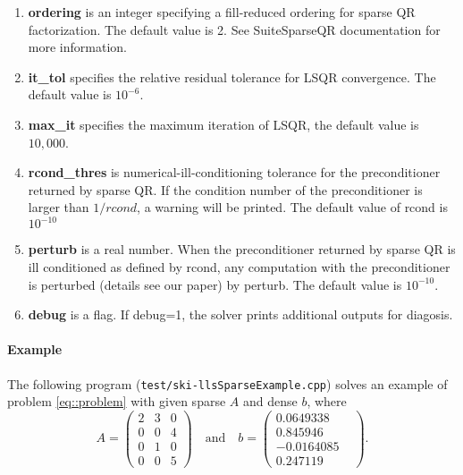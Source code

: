 \documentclass[english,11pt]{article}
\begin{document}
\begin{itemize}
\begin{enumerate}
			\item {\bf ordering} is an integer specifying a fill-reduced ordering for sparse QR factorization. The default value is 2. See SuiteSparseQR documentation for more information. 

			\item {\bf it_tol} specifies the relative residual tolerance for LSQR convergence. The default value is $10^{-6}$.
			

			\item {\bf max_it} specifies the maximum iteration of LSQR, the default value is $10,000$. 

			\item {\bf rcond_{thres}} is numerical-ill-conditioning tolerance for the preconditioner returned by sparse QR. If the condition number of the preconditioner is larger than $1/rcond$, a warning will be printed. The default value of rcond is $10^{-10}$

			\item {\bf perturb} is a real number. When the preconditioner returned by sparse QR is ill conditioned as defined by rcond, any computation with the preconditioner is perturbed (details see our paper) by perturb. The default value is $10^{-10}$. 

			\item {\bf debug} is a flag. If debug=1, the solver prints additional outputs for diagosis. 
		\end{enumerate}
		

	\end{itemize}

\paragraph{Example}

The following program ({\tt test/ski-llsSparseExample.cpp}) solves an example of problem \eqref{eq::problem} with given sparse $A$ and dense $b$, where 
\begin{equation}
A = \begin{pmatrix}
     2     & 3     & 0\\
     0     & 0     & 4\\
     0     & 1     & 0\\
     0     & 0     & 5
\end{pmatrix} \quad \text{and} \quad 
b = \begin{pmatrix}
0.0649338 \\
0.845946 \\
-0.0164085\\
0.247119 & 
\end{pmatrix}.
\end{equation}
\end{document}
